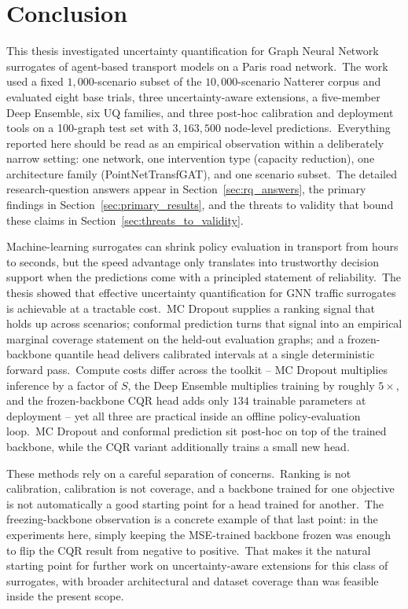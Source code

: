 
\chapter{Conclusion}\label{chapter:conclusion}

This thesis investigated uncertainty quantification for Graph Neural Network surrogates of agent-based transport models on a Paris road network.\ The work used a fixed $1{,}000$-scenario subset of the $10{,}000$-scenario Natterer corpus and evaluated eight base trials, three uncertainty-aware extensions, a five-member Deep Ensemble, six UQ families, and three post-hoc calibration and deployment tools on a 100-graph test set with $3{,}163{,}500$ node-level predictions.\ Everything reported here should be read as an empirical observation within a deliberately narrow setting: one network, one intervention type (capacity reduction), one architecture family (PointNetTransfGAT), and one scenario subset.\ The detailed research-question answers appear in Section~\ref{sec:rq_answers}, the primary findings in Section~\ref{sec:primary_results}, and the threats to validity that bound these claims in Section~\ref{sec:threats_to_validity}.

Machine-learning surrogates can shrink policy evaluation in transport from hours to seconds, but the speed advantage only translates into trustworthy decision support when the predictions come with a principled statement of reliability.\ The thesis showed that effective uncertainty quantification for GNN traffic surrogates is achievable at a tractable cost.\ MC Dropout supplies a ranking signal that holds up across scenarios; conformal prediction turns that signal into an empirical marginal coverage statement on the held-out evaluation graphs; and a frozen-backbone quantile head delivers calibrated intervals at a single deterministic forward pass.\ Compute costs differ across the toolkit -- MC Dropout multiplies inference by a factor of $S$, the Deep Ensemble multiplies training by roughly $5\times$, and the frozen-backbone CQR head adds only $134$ trainable parameters at deployment -- yet all three are practical inside an offline policy-evaluation loop.\ MC Dropout and conformal prediction sit post-hoc on top of the trained backbone, while the CQR variant additionally trains a small new head.

These methods rely on a careful separation of concerns.\ Ranking is not calibration, calibration is not coverage, and a backbone trained for one objective is not automatically a good starting point for a head trained for another.\ The freezing-backbone observation is a concrete example of that last point: in the experiments here, simply keeping the MSE-trained backbone frozen was enough to flip the CQR result from negative to positive.\ That makes it the natural starting point for further work on uncertainty-aware extensions for this class of surrogates, with broader architectural and dataset coverage than was feasible inside the present scope.

